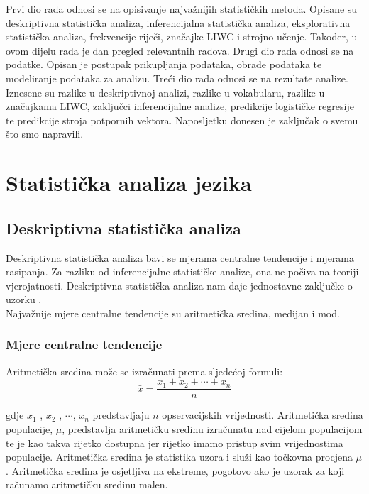 \documentclass[times,utf8,zavrsni]{fer}
\begin{document}
Prvi dio rada odnosi se na opisivanje najvažnijih statističkih metoda. Opisane su deskriptivna statistička analiza, inferencijalna statistička analiza, eksplorativna statistička analiza, frekvencije riječi, značajke LIWC i strojno učenje. Također, u ovom dijelu rada je dan pregled relevantnih radova. Drugi dio rada odnosi se na podatke. Opisan je postupak prikupljanja podataka, obrade podataka te modeliranje podataka za analizu. Treći dio rada odnosi se na rezultate analize. Iznesene su razlike u deskriptivnoj analizi, razlike u vokabularu, razlike u značajkama LIWC, zaključci inferencijalne analize, predikcije logističke regresije te predikcije stroja potpornih vektora. Naposljetku donesen je zaključak o svemu što smo napravili.

\chapter{Statistička analiza jezika}
\section{Deskriptivna statistička analiza}
Deskriptivna statistička analiza bavi se mjerama centralne tendencije i mjerama rasipanja. Za razliku od inferencijalne statističke analize, ona ne počiva na teoriji vjerojatnosti. Deskriptivna statistička analiza nam daje jednostavne zaključke o uzorku \citep{openintro}. \\

Najvažnije mjere centralne tendencije su aritmetička sredina, medijan i mod. \\

\subsection{Mjere centralne tendencije}
Aritmetička sredina može se izračunati prema sljedećoj formuli: 
\begin{equation}
\label{mean}
\bar{x}={\frac {x_{1}+x_{2}+\cdots +x_{n}}{n}}
\end{equation}


\noindent gdje ${x_{1}}$ , ${x_{2}}$ , ${\cdots}$, ${x_{n}}$ predstavljaju ${n}$ opservacijskih vrijednosti. Aritmetička sredina populacije, ${\mu}$, predstavlja aritmetičku sredinu izračunatu nad cijelom populacijom te je kao takva rijetko dostupna jer rijetko imamo pristup svim vrijednostima populacije. Aritmetička sredina je statistika uzora i služi kao točkovna procjena ${\mu}$. Aritmetička sredina je osjetljiva na ekstreme, pogotovo ako je uzorak za koji računamo aritmetičku sredinu malen.\\
\end{document}
